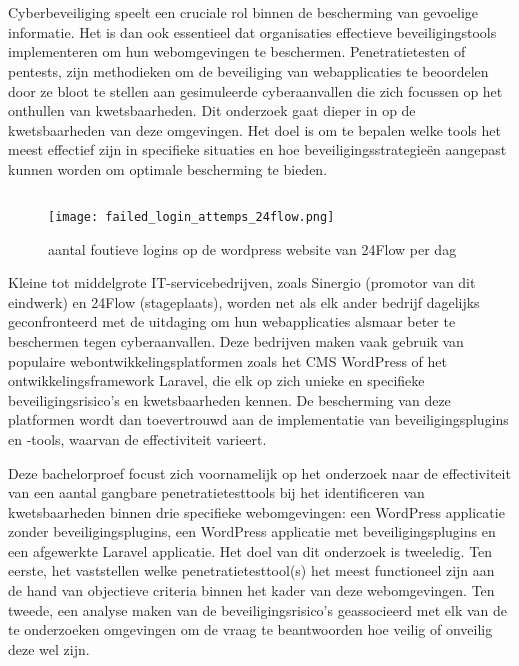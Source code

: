 
\chapter{}%
\label{ch:inleiding}
Cyberbeveiliging speelt een cruciale rol binnen de bescherming van gevoelige informatie. Het is dan ook essentieel dat organisaties 
effectieve beveiligingstools implementeren om hun webomgevingen te beschermen. Penetratietesten of pentests, zijn  
methodieken om de beveiliging van webapplicaties te beoordelen door ze bloot te stellen aan gesimuleerde 
cyberaanvallen die zich focussen op het onthullen van kwetsbaarheden. Dit onderzoek gaat dieper in op de kwetsbaarheden van deze omgevingen. Het doel is om te bepalen welke tools 
het meest effectief zijn in specifieke situaties en hoe beveiligingsstrategieën aangepast kunnen worden om optimale 
bescherming te bieden.


\section{}%
\label{sec:probleemstelling}

\begin{figure}
  \centering
  \texttt{[image: failed\_login\_attemps\_24flow.png]}
  \caption[aantal foutieve logins op de wordpress website van 24Flow per dag ]{aantal foutieve logins op de wordpress website van 24Flow per dag }
\end{figure}
Kleine tot middelgrote IT-servicebedrijven, zoals Sinergio (promotor van dit eindwerk) en 24Flow (stageplaats), worden net 
als elk ander bedrijf dagelijks geconfronteerd met de uitdaging om hun 
webapplicaties alsmaar beter te beschermen tegen cyberaanvallen. Deze bedrijven maken vaak gebruik van populaire webontwikkelingsplatformen 
zoals het CMS WordPress of het ontwikkelingsframework Laravel, die elk op zich unieke en specifieke beveiligingsrisico's en 
kwetsbaarheden kennen. De bescherming van deze platformen wordt dan toevertrouwd aan de implementatie van beveiligingsplugins 
en -tools, waarvan de effectiviteit varieert.

Deze bachelorproef focust zich voornamelijk op het onderzoek naar de effectiviteit van een aantal gangbare penetratietesttools  
bij het identificeren van kwetsbaarheden binnen drie specifieke webomgevingen: een WordPress applicatie zonder beveiligingsplugins,
een WordPress applicatie met beveiligingsplugins en een afgewerkte Laravel applicatie. Het doel van dit onderzoek is tweeledig. 
Ten eerste, het vaststellen welke penetratietesttool(s) het meest functioneel zijn aan de hand van objectieve criteria binnen het kader van deze webomgevingen. Ten tweede, 
een analyse maken van de beveiligingsrisico's geassocieerd met elk van de te onderzoeken omgevingen om de vraag te beantwoorden hoe 
veilig of onveilig deze wel zijn.

